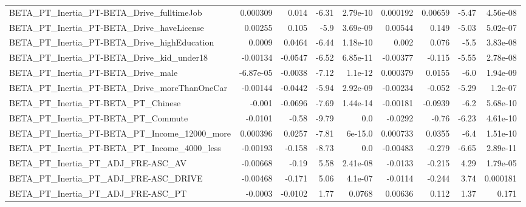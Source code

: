 \begin{tabular}{lrrrrrrrr}
BETA\_PT\_Inertia\_PT-BETA\_Drive\_fulltimeJob          &    0.000309 &        0.014 &    -6.31 & 2.79e-10 &   0.000192 &     0.00659 &        -5.47 &      4.56e-08 \\
BETA\_PT\_Inertia\_PT-BETA\_Drive\_haveLicense          &     0.00255 &        0.105 &     -5.9 & 3.69e-09 &    0.00544 &       0.149 &        -5.03 &      5.02e-07 \\
BETA\_PT\_Inertia\_PT-BETA\_Drive\_highEducation        &      0.0009 &       0.0464 &    -6.44 & 1.18e-10 &      0.002 &       0.076 &         -5.5 &      3.83e-08 \\
BETA\_PT\_Inertia\_PT-BETA\_Drive\_kid\_under18          &    -0.00134 &      -0.0547 &    -6.52 & 6.85e-11 &   -0.00377 &      -0.115 &        -5.55 &      2.78e-08 \\
BETA\_PT\_Inertia\_PT-BETA\_Drive\_male                 &   -6.87e-05 &      -0.0038 &    -7.12 &  1.1e-12 &   0.000379 &      0.0155 &         -6.0 &      1.94e-09 \\
BETA\_PT\_Inertia\_PT-BETA\_Drive\_moreThanOneCar       &    -0.00144 &      -0.0442 &    -5.94 & 2.92e-09 &   -0.00234 &      -0.052 &        -5.29 &       1.2e-07 \\
BETA\_PT\_Inertia\_PT-BETA\_PT\_Chinese                 &      -0.001 &      -0.0696 &    -7.69 & 1.44e-14 &   -0.00181 &     -0.0939 &         -6.2 &      5.68e-10 \\
BETA\_PT\_Inertia\_PT-BETA\_PT\_Commute                 &     -0.0101 &        -0.58 &    -9.79 &      0.0 &    -0.0292 &       -0.76 &        -6.23 &      4.61e-10 \\
BETA\_PT\_Inertia\_PT-BETA\_PT\_Income\_12000\_more       &    0.000396 &       0.0257 &    -7.81 &  6e-15.0 &   0.000733 &      0.0355 &         -6.4 &      1.51e-10 \\
BETA\_PT\_Inertia\_PT-BETA\_PT\_Income\_4000\_less        &    -0.00193 &       -0.158 &    -8.73 &      0.0 &   -0.00483 &      -0.279 &        -6.65 &      2.89e-11 \\
BETA\_PT\_Inertia\_PT\_ADJ\_FRE-ASC\_AV                  &    -0.00668 &        -0.19 &     5.58 & 2.41e-08 &    -0.0133 &      -0.215 &         4.29 &      1.79e-05 \\
BETA\_PT\_Inertia\_PT\_ADJ\_FRE-ASC\_DRIVE               &    -0.00468 &       -0.171 &     5.06 &  4.1e-07 &    -0.0114 &      -0.244 &         3.74 &      0.000181 \\
BETA\_PT\_Inertia\_PT\_ADJ\_FRE-ASC\_PT                  &     -0.0003 &      -0.0102 &     1.77 &   0.0768 &    0.00636 &       0.112 &         1.37 &         0.171 \\

\end{tabular}
